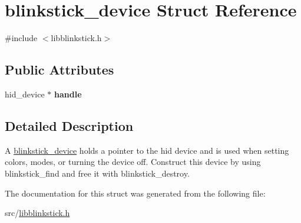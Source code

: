 \hypertarget{structblinkstick__device}{}\section{blinkstick\+\_\+device Struct Reference}
\label{structblinkstick__device}


{\ttfamily \#include $<$libblinkstick.\+h$>$}

\subsection*{Public Attributes}
\begin{DoxyCompactItemize}
\item 
\mbox{\label{structblinkstick__device_a4bb782abadc4e00570554c761a5e0768}} 
hid\+\_\+device $\ast$ {\bfseries handle}
\end{DoxyCompactItemize}


\subsection{Detailed Description}
A \hyperlink{structblinkstick__device}{blinkstick\+\_\+device} holds a pointer to the hid device and is used when setting colors, modes, or turning the device off. Construct this device by using blinkstick\+\_\+find and free it with blinkstick\+\_\+destroy. 

The documentation for this struct was generated from the following file\+:\begin{DoxyCompactItemize}
\item 
src/\hyperlink{libblinkstick_8h}{libblinkstick.\+h}\end{DoxyCompactItemize}
